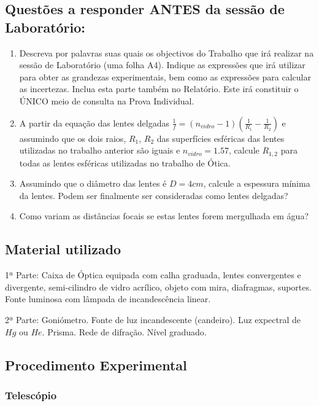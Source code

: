 \documentclass[a4paper,12pt]{article}      %
\begin{document}
\subsection{\sf Questões a responder ANTES da sessão de Laboratório:}
\begin{enumerate}
\item Descreva por palavras suas quais os objectivos do Trabalho que irá realizar na sessão de Laboratório (uma folha A4). Indique as expressões que irá utilizar para obter as grandezas experimentais, bem como as expressões para calcular as incertezas. Inclua esta parte também no Relatório. Este irá constituir o ÚNICO meio de consulta na Prova Individual.
	
\item A partir da equação das lentes delgadas $\frac{1}{f} = (n_{vidro}-1) \left(\frac{1}{R_1} -\frac{1}{R_2}\right)$ e assumindo que os dois raios, $R_1$, $R_2$ das superfícies esféricas das lentes utilizadas no trabalho anterior são iguais e $ n_{vidro}=1.57$, calcule $R_{1,2}$ para todas as lentes esféricas utilizadas no trabalho de Ótica.
\item Assumindo que o diâmetro das lentes é $D=4cm$, calcule a espessura mínima da lentes. Podem ser finalmente ser consideradas como lentes delgadas?
\item Como variam as distâncias focais se estas lentes forem mergulhada em água?
\end{enumerate}

\subsection{\sf Material utilizado}
1ª Parte: Caixa de Óptica equipada com calha graduada, lentes convergentes e divergente, semi-cilindro de 
vidro acrílico, objeto com mira, diafragmas, suportes. 
Fonte luminosa com lâmpada de incandescência linear. 

2ª Parte: Goniómetro. Fonte de luz incandescente (candeiro). Luz expectral de $Hg$ ou $He$. Prisma. Rede de difração. Nível graduado.

\subsection{\sf Procedimento Experimental}

\subsubsection{\sf  Telescópio}
\end{document}
